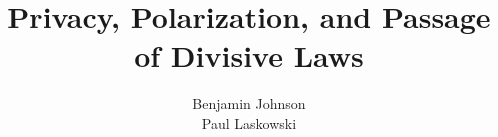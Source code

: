 \documentclass{sig-alternate}
\begin{document}
\title{Privacy, Polarization, and Passage of Divisive Laws}%


%
\author{
%
%
\alignauthor
Benjamin Johnson\\
\alignauthor
Paul Laskowski\\
}


\maketitle

\begin{abstract}

\end{abstract}





%




\end{document}
